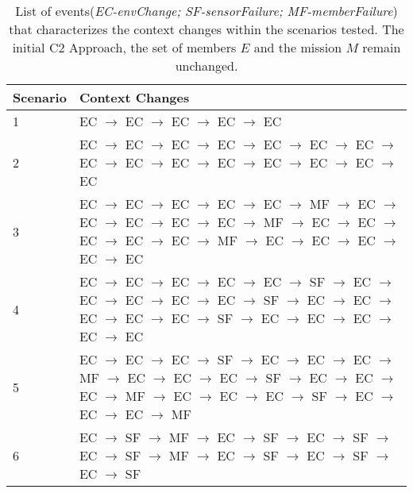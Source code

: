 \begin{table}[h]
\centenring
\fontsize{9}{9}
\selectfont
\caption{List of events(\textit{EC-envChange; SF-sensorFailure; MF-memberFailure}) that characterizes the context changes within the scenarios tested. The initial C2 Approach, the set of members $E$ and the mission $M$ remain unchanged.}
\label{tab:scenarios}
\begin{tabular}{|m{}|m{}|}
\hline
\rowcolor{lightgray}
 \textbf {Scenario} & \hfil  \textbf {Context Changes} \\
\hline
 \hfil 1 & EC $\rightarrow$ EC $\rightarrow$ EC $\rightarrow$ EC $\rightarrow$ EC\\
\hline 
 \hfil 2 & EC $\rightarrow$ EC $\rightarrow$ EC $\rightarrow$ EC $\rightarrow$ EC $\rightarrow$ EC $\rightarrow$ EC $\rightarrow$ EC $\rightarrow$ EC $\rightarrow$ EC $\rightarrow$ EC $\rightarrow$ EC $\rightarrow$ EC $\rightarrow$ EC $\rightarrow$ EC \\
\hline 
 \hfil 3 & 
EC $\rightarrow$ EC $\rightarrow$ EC $\rightarrow$ EC $\rightarrow$ EC $\rightarrow$ MF $\rightarrow$ EC $\rightarrow$ EC $\rightarrow$ EC $\rightarrow$ EC $\rightarrow$ EC $\rightarrow$ MF $\rightarrow$ EC $\rightarrow$ EC $\rightarrow$ EC $\rightarrow$ EC $\rightarrow$ EC $\rightarrow$ MF $\rightarrow$ EC $\rightarrow$ EC $\rightarrow$ EC $\rightarrow$ EC $\rightarrow$ EC  \\
\hline 
 \hfil 4 & EC $\rightarrow$ EC $\rightarrow$ EC $\rightarrow$ EC $\rightarrow$ EC $\rightarrow$ SF $\rightarrow$ EC $\rightarrow$ EC $\rightarrow$ EC $\rightarrow$ EC $\rightarrow$ EC $\rightarrow$ SF $\rightarrow$ EC $\rightarrow$ EC $\rightarrow$ EC $\rightarrow$ EC $\rightarrow$ EC $\rightarrow$ SF $\rightarrow$ EC $\rightarrow$ EC $\rightarrow$ EC $\rightarrow$ EC $\rightarrow$ EC  \\
\hline 
 \hfil 5 & EC $\rightarrow$ EC $\rightarrow$ EC $\rightarrow$ SF $\rightarrow$ EC $\rightarrow$ EC $\rightarrow$ EC $\rightarrow$ MF $\rightarrow$ EC $\rightarrow$ EC $\rightarrow$ EC $\rightarrow$ SF $\rightarrow$ EC $\rightarrow$ EC $\rightarrow$ EC $\rightarrow$ MF $\rightarrow$ EC $\rightarrow$ EC $\rightarrow$ EC $\rightarrow$ SF $\rightarrow$ EC $\rightarrow$ EC $\rightarrow$ EC $\rightarrow$ MF  \\
\hline 
 \hfil 6 & EC $\rightarrow$ SF $\rightarrow$ MF $\rightarrow$ EC $\rightarrow$ SF $\rightarrow$ EC $\rightarrow$ SF $\rightarrow$ EC $\rightarrow$ SF $\rightarrow$ MF $\rightarrow$ EC $\rightarrow$ SF $\rightarrow$ EC $\rightarrow$ SF $\rightarrow$ EC $\rightarrow$ SF \\

\end{tabular}
\end{table}
